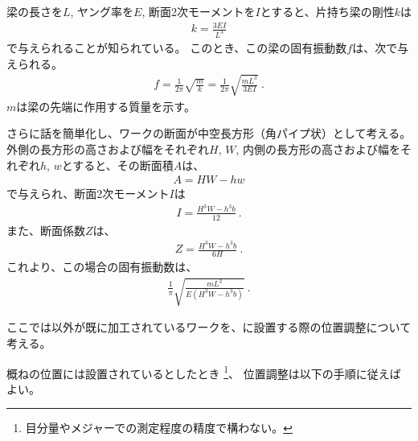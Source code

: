 梁の長さを$L$, ヤング率を$E$, 断面2次モーメントを$I$とすると、片持ち梁の剛性$k$は
\begin{align*}
  k = \frac{3EI}{L^3}
\end{align*}
で与えられることが知られている。
このとき、この梁の固有振動数$f$は、次で与えられる。
\begin{align*}
  f = \frac1{2\pi}\sqrt{\frac mk}
    = \frac1{2\pi}\sqrt{\frac{mL^3}{3EI}}\ .
\end{align*}
$m$は梁の先端に作用する質量を示す。

さらに話を簡単化し、ワークの断面が中空長方形（角パイプ状）として考える。
外側の長方形の高さおよび幅をそれぞれ$H$, $W$, 内側の長方形の高さおよび幅をそれぞれ$h$, $w$とすると、その断面積$A$は、
\begin{align*}
  A = HW-hw
\end{align*}
で与えられ、断面2次モーメント$I$は
\begin{align*}
  I = \frac{H^3W-h^3b}{12}\ .
\end{align*}
また、断面係数$Z$は、
\begin{align*}
  Z = \frac{H^3W-h^3b}{6H}\ .
\end{align*}
これより、この場合の固有振動数は、
\begin{align*}
  \frac1\pi\sqrt{\frac{mL^3}{E\left(H^3W-h^3b\right)}}\ .
\end{align*}



\clearpage
ここでは\Dimple 以外が既に加工されているワークを、\DMC に設置する際の位置調整について考える。

概ねの位置には設置されているとしたとき
\footnote{目分量やメジャーでの測定程度の精度で構わない。}、
位置調整は以下の手順に従えばよい。

